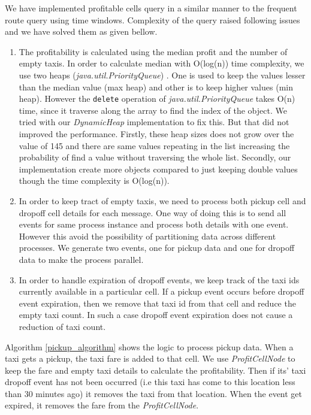 We have implemented profitable cells query in a similar manner to the frequent route query using  time windows. Complexity of the query raised following issues and we have solved them as given bellow.
\begin{enumerate}
	\item The profitability is calculated using the median profit and the number of empty taxis. In order to calculate median with O(log(n)) time complexity, we use two heaps (\textit{java.util.PriorityQueue}) . One is used to keep the values lesser than the median value (max heap) and other is to keep higher values (min heap). However the \texttt{delete} operation of \textit{java.util.PriorityQueue} takes O(n) time, since it traverse along the array to find the index of the object. We tried with our \textit{DynamicHeap} implementation to fix this. But that did not improved the performance. Firstly, these heap sizes does not grow over the value of 145 and there are same values repeating in the list increasing the probability of find a value without traversing the whole list. Secondly, our implementation create more objects compared to just keeping double values though the time complexity is O(log(n)). 
	\item In order to keep tract of empty taxis, we need to process both pickup cell and dropoff cell details for each message. One way of doing this is to send all events for same process instance and process both details with one event. However this avoid the possibility of partitioning data across different processes. We generate two events, one for pickup data and one for dropoff data to make the process parallel. 
	\item In order to handle expiration of dropoff events, we keep track of the taxi ids currently available in a particular cell. If a pickup event occurs before dropoff event expiration, then we remove that taxi id from that cell and reduce the empty taxi count. In such a case dropoff event expiration does not cause a reduction of taxi count.
\end{enumerate}

Algorithm \ref{pickup_algorithm} shows the logic to process pickup data. When a taxi gets a pickup, the taxi fare is added to that cell. We use \textit{ProfitCellNode} to keep the fare and empty taxi details to calculate the profitability. Then if its' taxi dropoff event has not been occurred (i.e this taxi has come to this location less than 30 minutes ago) it removes the taxi from that location. When the event get expired, it removes the fare from the \textit{ProfitCellNode}. 

